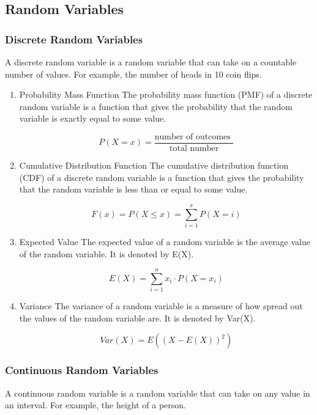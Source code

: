 \documentclass[11pt]{article}
\def\cheatsheetitemsep{-0.5em}
\let\olditem\item
\def\item{\vspace{\cheatsheetitemsep}\olditem}
\begin{document}
\subsection{Random Variables}
\label{sec:org1cc580f}
\subsubsection{Discrete Random Variables}
\label{sec:org70b3992}
A discrete random variable is a random variable that can take on a countable number of values. For example, the number of heads in 10 coin flips.

\begin{enumerate}
\item Probability Mass Function
\label{sec:org3651ae6}
The probability mass function (PMF) of a discrete random variable is a function that gives the probability that the random variable is exactly equal to some value.

\[
P(X=x) = \frac{\text{number of outcomes }}{\text{total number}}
\]

\item Cumulative Distribution Function
\label{sec:org0f4074f}
The cumulative distribution function (CDF) of a discrete random variable is a function that gives the probability that the random variable is less than or equal to some value.

\[
F(x) = P(X \leq x) = \sum_{i=1}^x P(X=i)
\]
\item Expected Value
\label{sec:org73241e6}
The expected value of a random variable is the average value of the random variable. It is denoted by E(X).

\[
E(X) = \sum_{i=1}^n x_i \cdot P(X=x_i)
\]

\item Variance
\label{sec:orgdee2ed5}
The variance of a random variable is a measure of how spread out the values of the random variable are. It is denoted by Var(X).

\[
Var(X) = E((X - E(X))^2)
\]
\end{enumerate}

\subsubsection{Continuous Random Variables}
\label{sec:org0b77c5b}
A continuous random variable is a random variable that can take on any value in an interval. For example, the height of a person.
\end{document}
